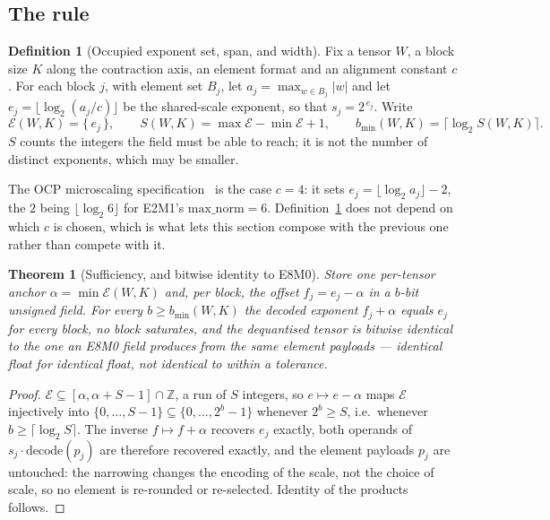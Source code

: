 \documentclass[11pt]{article}
\newtheorem{theorem}{Theorem}
\theoremstyle{definition}
\newtheorem{definition}{Definition}
\begin{document}
\subsection{The rule}
\label{sec:widthrule-block}

\begin{definition}[Occupied exponent set, span, and width]
\label{def:span}
Fix a tensor $W$, a block size $K$ along the contraction axis, an element format
and an alignment constant $c$. For each block $j$, with element set $B_j$, let
$a_j = \max_{w \in B_j}|w|$
and let $e_j = \lfloor \log_2 (a_j/c) \rfloor$ be the shared-scale exponent, so
that $s_j = 2^{\,e_j}$. Write
\[
  \mathcal{E}(W,K) = \{\, e_j \,\},
  \qquad
  S(W,K) = \max \mathcal{E} - \min \mathcal{E} + 1,
  \qquad
  b_{\min}(W,K) = \bigl\lceil \log_2 S(W,K) \bigr\rceil .
\]
$S$ counts the integers the field must be able to reach; it is not the number of
distinct exponents, which may be smaller.
\end{definition}

The OCP microscaling specification~\cite{ocpmx} is the case $c = 4$: it sets
$e_j = \lfloor \log_2 a_j \rfloor - 2$, the $2$ being $\lfloor \log_2 6 \rfloor$
for E2M1's $\mathrm{max\_norm} = 6$. Definition~\ref{def:span} does not depend on
which $c$ is chosen, which is what lets this section compose with the previous
one rather than compete with it.

\begin{theorem}[Sufficiency, and bitwise identity to E8M0]
\label{thm:width}
Store one per-tensor anchor $\alpha = \min \mathcal{E}(W,K)$ and, per block, the
offset $f_j = e_j - \alpha$ in a $b$-bit unsigned field. For every
$b \ge b_{\min}(W,K)$ the decoded exponent $f_j + \alpha$ equals $e_j$ for every
block, no block saturates, and the dequantised tensor is \emph{bitwise identical}
to the one an E8M0 field produces from the same element payloads --- identical
float for identical float, not identical to within a tolerance.
\end{theorem}

\begin{proof}
$\mathcal{E} \subseteq [\alpha, \alpha + S - 1] \cap \mathbb{Z}$, a run of $S$
integers, so $e \mapsto e - \alpha$ maps $\mathcal{E}$ injectively into
$\{0,\dots,S-1\} \subseteq \{0,\dots,2^{b}-1\}$ whenever $2^{b} \ge S$, i.e.\
whenever $b \ge \lceil \log_2 S\rceil$. The inverse $f \mapsto f + \alpha$
recovers $e_j$ exactly, both operands of $s_j \cdot \mathrm{decode}(p_j)$ are
therefore recovered exactly, and the element payloads $p_j$ are untouched: the
narrowing changes the encoding of the scale, not the choice of scale, so no
element is re-rounded or re-selected. Identity of the products follows.
\end{proof}
\end{document}
